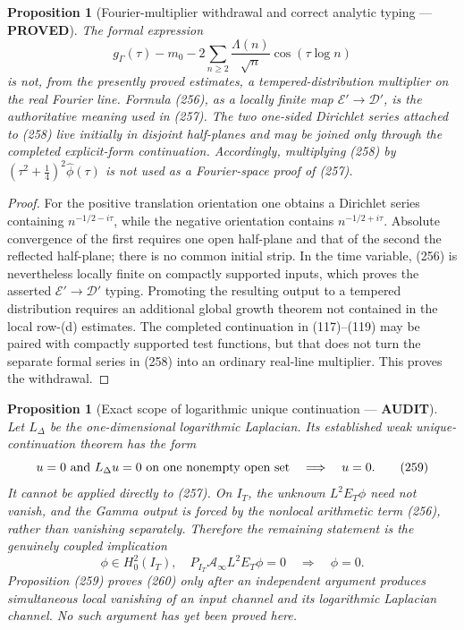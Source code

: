 \documentclass[11pt]{article}
\newtheorem{proposition}[theorem]{Proposition}
\newcommand{\PROVED}{\textcolor{green!45!black}{\textbf{PROVED}}}
\newcommand{\AUDIT}{\textcolor{orange!75!black}{\textbf{AUDIT}}}
\begin{document}
\begin{proposition}[Fourier-multiplier withdrawal and correct analytic
typing --- \PROVED]
The formal expression
\begin{equation}
 g_\Gamma(\tau)-m_0
 -2\sum_{n\ge2}\frac{\Lambda(n)}{\sqrt n}
       \cos(\tau\log n)                               \tag{258}
\end{equation}
is not, from the presently proved estimates, a tempered-distribution
multiplier on the real Fourier line.  Formula (256), as a locally finite
map $\mathcal E'\to\mathcal D'$, is the authoritative meaning used in
(257).  The two one-sided Dirichlet series attached to (258) live initially
in disjoint half-planes and may be joined only through the completed
explicit-form continuation.  Accordingly, multiplying (258) by
$(\tau^2+\tfrac14)^2\widehat\phi(\tau)$ is not used as a Fourier-space proof
of (257).
\end{proposition}

\begin{proof}
For the positive translation orientation one obtains a Dirichlet series
containing $n^{-1/2-i\tau}$, while the negative orientation contains
$n^{-1/2+i\tau}$.  Absolute convergence of the first requires one open
half-plane and that of the second the reflected half-plane; there is no
common initial strip.  In the time variable, (256) is nevertheless locally
finite on compactly supported inputs, which proves the asserted
$\mathcal E'\to\mathcal D'$ typing.  Promoting the resulting output to a
tempered distribution requires an additional global growth theorem not
contained in the local row-(d) estimates.  The completed continuation in
(117)--(119) may be paired with compactly supported test functions, but that
does not turn the separate formal series in (258) into an ordinary real-line
multiplier.  This proves the withdrawal.
\end{proof}

\begin{proposition}[Exact scope of logarithmic unique continuation ---
\AUDIT]
Let $L_\Delta$ be the one-dimensional logarithmic Laplacian.  Its established
weak unique-continuation theorem has the form
\begin{equation}
 u=0\ \hbox{and}\ L_\Delta u=0\ \hbox{on one nonempty open set}
 \quad\Longrightarrow\quad u=0.                      \tag{259}
\end{equation}
It cannot be applied directly to (257).  On $I_T$, the unknown
$L^2E_T\phi$ need not vanish, and the Gamma output is forced by the nonlocal
arithmetic term (256), rather than vanishing separately.  Therefore the
remaining statement is the genuinely coupled implication
\begin{equation}
 \boxed{\quad
 \phi\in H_0^2(I_T),\quad
 P_{I_T}\mathcal A_\infty L^2E_T\phi=0
 \quad\Longrightarrow\quad\phi=0 .\quad}             \tag{260}
\end{equation}
Proposition (259) proves (260) only after an independent argument produces
simultaneous local vanishing of an input channel and its logarithmic
Laplacian channel.  No such argument has yet been proved here.
\end{proposition}
\end{document}

